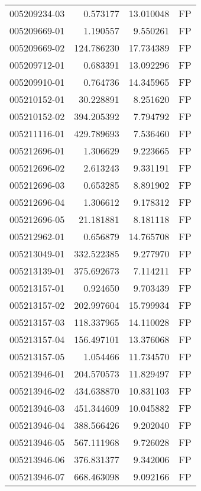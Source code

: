 \begin{tabular}{lrrl}
005209234-03 &    0.573177 &      13.010048 &   FP \\
005209669-01 &    1.190557 &       9.550261 &   FP \\
005209669-02 &  124.786230 &      17.734389 &   FP \\
005209712-01 &    0.683391 &      13.092296 &   FP \\
005209910-01 &    0.764736 &      14.345965 &   FP \\
005210152-01 &   30.228891 &       8.251620 &   FP \\
005210152-02 &  394.205392 &       7.794792 &   FP \\
005211116-01 &  429.789693 &       7.536460 &   FP \\
005212696-01 &    1.306629 &       9.223665 &   FP \\
005212696-02 &    2.613243 &       9.331191 &   FP \\
005212696-03 &    0.653285 &       8.891902 &   FP \\
005212696-04 &    1.306612 &       9.178312 &   FP \\
005212696-05 &   21.181881 &       8.181118 &   FP \\
005212962-01 &    0.656879 &      14.765708 &   FP \\
005213049-01 &  332.522385 &       9.277970 &   FP \\
005213139-01 &  375.692673 &       7.114211 &   FP \\
005213157-01 &    0.924650 &       9.703439 &   FP \\
005213157-02 &  202.997604 &      15.799934 &   FP \\
005213157-03 &  118.337965 &      14.110028 &   FP \\
005213157-04 &  156.497101 &      13.376068 &   FP \\
005213157-05 &    1.054466 &      11.734570 &   FP \\
005213946-01 &  204.570573 &      11.829497 &   FP \\
005213946-02 &  434.638870 &      10.831103 &   FP \\
005213946-03 &  451.344609 &      10.045882 &   FP \\
005213946-04 &  388.566426 &       9.202040 &   FP \\
005213946-05 &  567.111968 &       9.726028 &   FP \\
005213946-06 &  376.831377 &       9.342006 &   FP \\
005213946-07 &  668.463098 &       9.092166 &   FP \\

\end{tabular}
